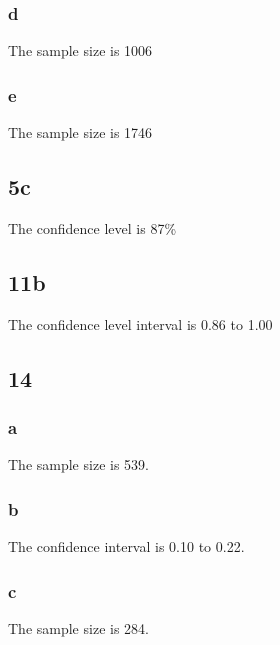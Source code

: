 \documentclass[11pt]{article}
\begin{document}
\subsubsection*{d}
The sample size is 1006
\subsubsection*{e}
The sample size is 1746
\subsection*{5c}
The confidence level is 87\%
\subsection*{11b}
The confidence level interval is 0.86 to 1.00
\subsection*{14}
\subsubsection*{a}
The sample size is 539.
\subsubsection*{b}
The confidence interval is 0.10 to 0.22.
\subsubsection*{c}
The sample size is 284.
\end{document}
